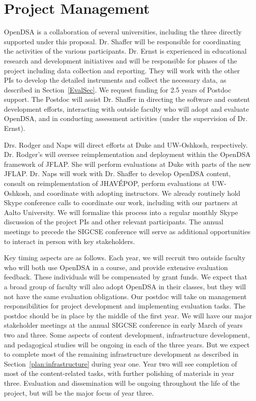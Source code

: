 \documentclass[11pt]{article}
\begin{document}
\section{Project Management}

OpenDSA is a collaboration of several universities,
including the three directly supported under this proposal.
Dr. Shaffer will be responsible for coordinating the activities of the
various participants.
Dr. Ernst is experienced in educational research and development
initiatives and will be responsible for phases of the project
including data collection and reporting.
They will work with the other PIs to develop the detailed instruments
and collect the necessary data, as described in Section~\ref{EvalSec}.
We request funding for 2.5 years of Postdoc support.
The Postdoc will assist Dr. Shaffer in directing the software and
content development efforts, interacting with outside faculty who will
adopt and evaluate OpenDSA, and in conducting assessment activities
(under the supervision of Dr. Ernst).

Drs. Rodger and Naps will direct efforts at Duke and UW-Oshkosh,
respectively.
Dr. Rodger's will oversee reimplementation and deployment within the
OpenDSA framework of JFLAP.
She will perform evaluations at Duke with parts of the new JFLAP.
Dr. Naps will work with Dr. Shaffer to develop OpenDSA content,
consult on reimplementation of JHAV\'{E}POP,
perform evaluations at UW-Oshkosh, and coordinate with adopting
instructors.
We already routinely hold Skype conference calls to coordinate our
work, including with our partners at Aalto University.
We will formalize this process into a regular monthly Skype discussion
of the project PIs and other relevant participants.
The annual meetings to precede the SIGCSE conference will serve as
additional opportunities to interact in person with key stakeholders.

Key timing aspects are as follows.
Each year, we will recruit two outside faculty who will both
use OpenDSA in a course, and provide extensive evaluation feedback.
These individuals will be compensated by grant funds.
We expect that a broad group of faculty will also adopt OpenDSA in
their classes, but they will not have the same evaluation obligations.
Our postdoc will take on management responsibilities for project
development and implementing evaluation tasks.
The postdoc should be in place by the middle of the first year.
We will have our major stakeholder meetings at the annual SIGCSE
conference in early March of years two and three.
Some aspects of content development, infrastructure development,
and pedagogical studies will be ongoing in each of the three years.
But we expect to complete most of the remaining infrastructure
development as described in Section~\ref{plan:infrastructure} during
year one.
Year two will see completion of most of the content-related tasks,
with further polishing of materials in year three.
Evaluation and dissemination will be ongoing throughout the life of the
project, but will be the major focus of year three.
\end{document}
